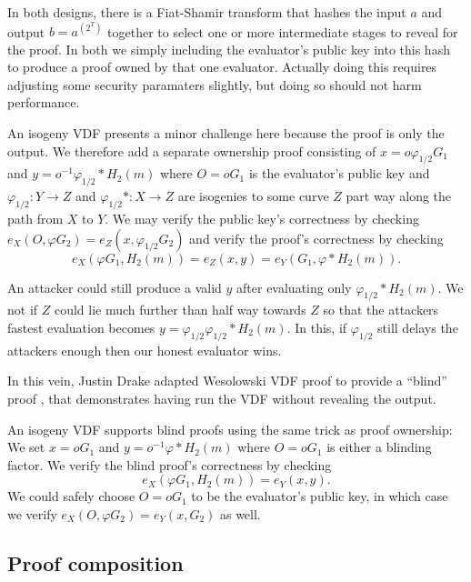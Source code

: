 \documentclass{article}
\newcommand\mathperiod{.}
\begin{document}
In both designs, there is a Fiat-Shamir transform that hashes the
input $a$ and output $b = a^(2^T)$ together to select one or more
intermediate stages to reveal for the proof.  In both we simply
including the evaluator's public key into this hash to produce a
proof owned by that one evaluator.  Actually doing this requires
adjusting some security paramaters slightly, but doing so should not
harm performance. 

An isogeny VDF presents a minor challenge here because the proof
is only the output.  We therefore add a separate ownership proof
consisting of $x = o φ_{1/2} G_1$ and $y = o^{-1} φ_{1/2}* H_2(m)$
where $O = o G_1$ is the evaluator's public key and
$φ_{1/2} : Y \to Z$ and $φ_{1/2}* : X \to Z$ are isogenies to
some curve $Z$ part way along the path from $X$ to $Y$.
We may verify the public key's correctness by checking
$e_X(O, φ G_2) = e_Z(x, φ_{1/2} G_2)$ and verify the proof's correctness by
checking
$$ e_X( φ G_1, H_2(m) ) = e_Z( x, y ) = e_Y( G_1, φ* H_2(m) ) \mathperiod $$

An attacker could still produce a valid $y$ after evaluating only
$φ_{1/2}* H_2(m)$.  We not  if $Z$ could lie much further than
half way towards $Z$ so that the attackers fastest evaluation
becomes $y = φ_{1/2} φ_{1/2}* H_2(m)$.  In this, if $φ_{1/2}$ 
still delays the attackers enough then our honest evaluator wins.

\smallskip

In this vein, Justin Drake adapted Wesolowski VDF proof to provide
a ``blind'' proof \cite{}, %
that demonstrates having run the VDF without revealing the output.

An isogeny VDF supports blind proofs using the same trick as proof
ownership:  We set $x = o G_1$ and $y = o^{-1} φ* H_2(m)$
where $O = o G_1$ is either a blinding factor.
We verify the blind proof's correctness by checking
$$ e_X( φ G_1, H_2(m) ) = e_Y( x, y ) \mathperiod $$ %
We could safely choose $O = o G_1$ to be the evaluator's public key,
in which case we verify $e_X(O, φ G_2) = e_Y(x, G_2)$ as well.


\subsection{Proof composition}
\end{document}
